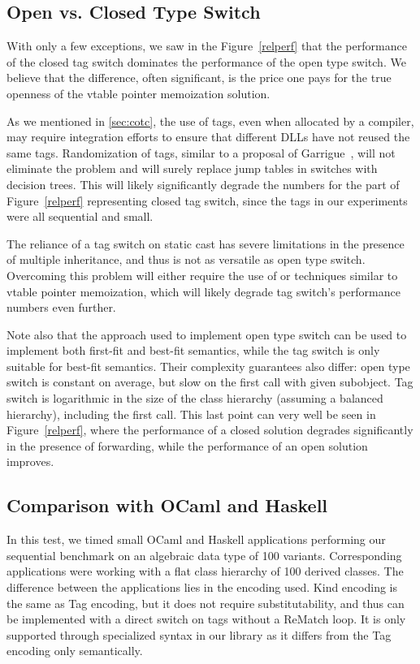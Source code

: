 \subsection{Open vs. Closed Type Switch}
\label{sec:cmp}

With only a few exceptions, we saw in the Figure~\ref{relperf} that the 
performance of the closed tag switch dominates the performance of the open type 
switch. We believe that the difference, often significant, is the price one pays 
for the true openness of the vtable pointer memoization solution.

As we mentioned in \textsection\ref{sec:cotc}, the use of tags, even when allocated 
by a compiler, may require integration efforts to ensure that different DLLs have 
not reused the same tags. Randomization of tags, similar to a proposal of 
Garrigue~\cite{garrigue-98}, will not eliminate the problem and will surely 
replace jump tables in switches with decision trees. This will likely 
significantly degrade the numbers for the part of Figure~\ref{relperf} 
representing closed tag switch, since the tags in our experiments were all 
sequential and small. 

The reliance of a tag switch on static cast has severe limitations in the 
presence of multiple inheritance, and thus is not as versatile as open type 
switch. Overcoming this problem will either require the use of 
 or techniques similar to vtable pointer memoization, which 
will likely degrade tag switch's performance numbers even further.

Note also that the approach used to implement open type switch can be used to 
implement both first-fit and best-fit semantics, while the tag switch is only suitable 
for best-fit semantics. Their complexity guarantees also differ: open type 
switch is constant on average, but slow on the first call with given subobject. 
Tag switch is logarithmic in the size of the class hierarchy 
(assuming a balanced hierarchy), including the first call. This last point can 
very well be seen in Figure~\ref{relperf}, where the performance of a closed solution
degrades significantly in the presence of forwarding, while the performance of an
open solution improves.

\subsection{Comparison with OCaml and Haskell}
\label{sec:ocaml}

In this test, we timed small OCaml and Haskell applications performing our sequential 
benchmark on an algebraic data type of 100 variants. Corresponding \Cpp{} 
applications were working with a flat class hierarchy of 100 derived classes. 
The difference between the \Cpp{} applications lies in the encoding used. Kind 
encoding is the same as Tag encoding, but it does not require substitutability, 
and thus can be implemented with a direct switch on tags without a ReMatch loop. 
It is only supported through specialized syntax in our library as it differs 
from the Tag encoding only semantically.

